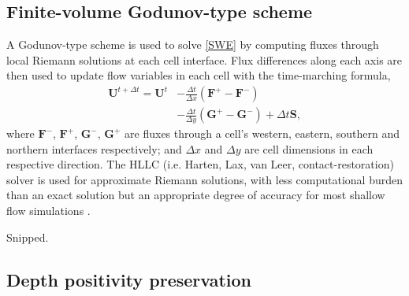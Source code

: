 \subsection{Finite-volume Godunov-type scheme}

A Godunov-type scheme \citep{Godunov1959} is used to solve \eqref{SWE} by computing fluxes through local Riemann solutions at each cell interface. Flux differences along each axis are then used to update flow variables in each cell with the time-marching formula, 
\begin{equation}
	\label{GodunovUpdate}
	\begin{alignedat}{2}
	\textbf{U}^{t+\Delta t} = \textbf{U}^t & - \frac{\Delta t}{\Delta x}(\textbf{F}^+ - \textbf{F}^-) \\
					     &  - \frac{\Delta t}{\Delta y}(\textbf{G}^+ - \textbf{G}^-) + \Delta t \textbf{S} , 
	\end{alignedat}
\end{equation}
where \(\textbf{F}^-\), \(\textbf{F}^+\), \(\textbf{G}^-\), \(\textbf{G}^+\)  are fluxes through a cell's western, eastern, southern and northern interfaces respectively; and \(\Delta x\) and \(\Delta y\) are cell dimensions in each respective direction. The HLLC (i.e. Harten, Lax, van Leer, contact-restoration) solver \citep{Toro1994} is used for approximate Riemann solutions, with less computational burden than an exact solution but an appropriate degree of accuracy for most shallow flow simulations \citep{Erduran2002,Zoppou2003}.

Snipped.

\subsection{Depth positivity preservation}

